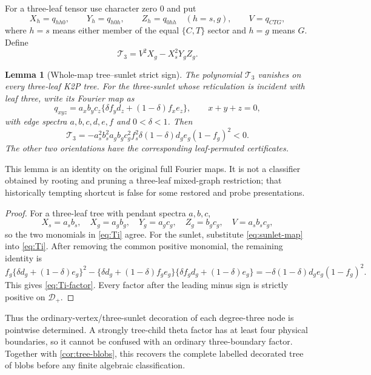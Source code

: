 \documentclass[11pt]{article}
\newtheorem{lemma}[theorem]{Lemma}
\theoremstyle{remark}
\newcommand{\Dplus}{\mathcal D_+}
\newcommand{\1}{\mathbf 1}
\begin{document}
For a three-leaf tensor use character zero \(0\) and put
\[
 X_h=q_{hh0},\qquad Y_h=q_{h0h},\qquad Z_h=q_{0hh}\quad(h=s,g),
 \qquad V=q_{CTG},
\]
where \(h=s\) means either member of the equal \(\{C,T\}\) sector and
\(h=g\) means \(G\).  Define
\begin{equation}\label{eq:Ti}
 \mathcal T_3=V^2X_g-X_s^2Y_gZ_g.
\end{equation}

\begin{lemma}[Whole-map tree--sunlet strict sign]\label{lem:Ti}
The polynomial \(\mathcal T_3\) vanishes on every three-leaf K2P tree.  For
the three-sunlet whose reticulation is incident with leaf three, write its
Fourier map as
\begin{equation}\label{eq:sunlet-map}
 q_{xyz}=a_xb_yc_z\{\delta f_y d_z+(1-\delta)f_xe_z\},
 \qquad x+y+z=0,
\end{equation}
with edge spectra \(a,b,c,d,e,f\) and \(0<\delta<1\).  Then
\begin{equation}\label{eq:Ti-factor}
 \mathcal T_3=
 -a_s^2b_s^2a_gb_gc_g^2f_s^2
 \delta(1-\delta)d_ge_g(1-f_g)^2<0.
\end{equation}
The other two orientations have the corresponding leaf-permuted
certificates.
\end{lemma}

This lemma is an identity on the original full Fourier maps.  It is not a
classifier obtained by rooting and pruning a three-leaf mixed-graph
restriction; that historically tempting shortcut is false for some restored
and probe presentations.

\begin{proof}
For a three-leaf tree with pendant spectra \(a,b,c\),
\[
 X_s=a_sb_s,\quad X_g=a_gb_g,\quad
 Y_g=a_gc_g,\quad Z_g=b_gc_g,\quad V=a_sb_sc_g,
\]
so the two monomials in \eqref{eq:Ti} agree.  For the sunlet, substitute
\eqref{eq:sunlet-map} into \eqref{eq:Ti}.  After removing the common positive
monomial, the remaining identity is
\[
 f_g\{\delta d_g+(1-\delta)e_g\}^2
 -\{\delta d_g+(1-\delta)f_ge_g\}
  \{\delta f_gd_g+(1-\delta)e_g\}
 =-\delta(1-\delta)d_ge_g(1-f_g)^2.
\]
This gives \eqref{eq:Ti-factor}.  Every factor after the leading minus sign
is strictly positive on \(\Dplus\).
\end{proof}

Thus the ordinary-vertex/three-sunlet decoration of each degree-three node is
pointwise determined.  A strongly tree-child theta factor has at least four
physical boundaries, so it cannot be confused with an ordinary three-boundary
factor.  Together with \cref{cor:tree-blobs}, this recovers the complete
labelled decorated tree of blobs before any finite algebraic classification.
\end{document}
